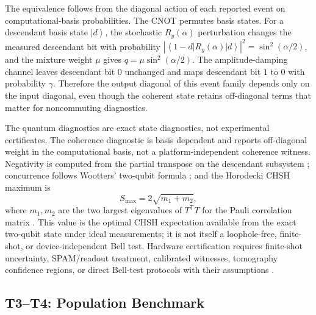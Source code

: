 \documentclass[11pt]{article}
\newcommand{\ket}[1]{\left|#1\right\rangle}
\newcommand{\bra}[1]{\left\langle#1\right|}
\begin{document}
The equivalence follows from the diagonal action of each reported event on computational-basis probabilities. The CNOT permutes basis states. For a descendant basis state $\ket{d}$, the stochastic $R_y(\alpha)$ perturbation changes the measured descendant bit with probability $|\bra{1-d}R_y(\alpha)\ket{d}|^2=\sin^2(\alpha/2)$, and the mixture weight $\mu$ gives $q=\mu\sin^2(\alpha/2)$. The amplitude-damping channel leaves descendant bit $0$ unchanged and maps descendant bit $1$ to $0$ with probability $\gamma$. Therefore the output diagonal of this event family depends only on the input diagonal, even though the coherent state retains off-diagonal terms that matter for noncommuting diagnostics.

The quantum diagnostics are exact state diagnostics, not experimental certificates. The coherence diagnostic is basis dependent and reports off-diagonal weight in the computational basis, not a platform-independent coherence witness. Negativity is computed from the partial transpose on the descendant subsystem \citep{horodecki1996separability,vidal2002computable}; concurrence follows Wootters' two-qubit formula \citep{wootters1998entanglement}; and the Horodecki CHSH maximum is
\begin{equation}
S_{\max}=2\sqrt{m_1+m_2},
\end{equation}
where $m_1,m_2$ are the two largest eigenvalues of $T^\mathsf{T}T$ for the Pauli correlation matrix \citep{horodecki1995violating}. This value is the optimal CHSH expectation available from the exact two-qubit state under ideal measurements; it is not itself a loophole-free, finite-shot, or device-independent Bell test. Hardware certification requires finite-shot uncertainty, SPAM/readout treatment, calibrated witnesses, tomography confidence regions, or direct Bell-test protocols with their assumptions \citep{guhne2009entanglement,christandl2012reliable,brunner2014bell,zhang2011asymptotically,elkouss2016nearly}.

\subsection{T3--T4: Population Benchmark}
\end{document}
